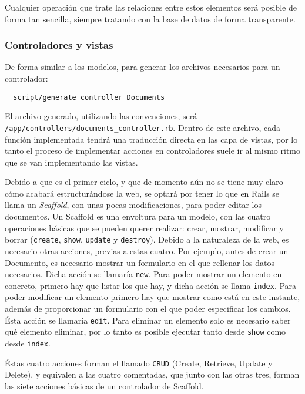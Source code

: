 Cualquier operación que trate las relaciones entre estos elementos será posible de forma tan sencilla, siempre tratando con la base de datos de forma transparente. 


\subsubsection{Controladores y vistas} %
\label{ssub:controlador}

De forma similar a los modelos, para generar los archivos necesarios para un controlador:

\begin{verbatim}
  script/generate controller Documents
\end{verbatim}

El archivo generado, utilizando las convenciones, será \texttt{/app/controllers/documents\_controller.rb}. Dentro de este archivo, cada función implementada tendrá una traducción directa en las capa de vistas, por lo tanto el proceso de implementar acciones en controladores suele ir al mismo ritmo que se van implementando las vistas.

Debido a que es el primer ciclo, y que de momento aún no se tiene muy claro cómo acabará estructurándose la web, se optará por tener lo que en Rails se llama un \emph{Scaffold}, con unas pocas modificaciones, para poder editar los documentos. Un Scaffold es una envoltura para un modelo, con las cuatro operaciones básicas que se pueden querer realizar: crear, mostrar, modificar y borrar (\texttt{create}, \texttt{show}, \texttt{update} y \texttt{destroy}). Debido a la naturaleza de la web, es necesario otras acciones, previas a estas cuatro. Por ejemplo, antes de crear un Documento, es necesario mostrar un formulario en el que rellenar los datos necesarios. Dicha acción se llamaría \texttt{new}. Para poder mostrar un elemento en concreto, primero hay que listar los que hay, y dicha acción se llama \texttt{index}. Para poder modificar un elemento primero hay que mostrar como está en este instante, además de proporcionar un formulario con el que poder especificar los cambios. Ésta acción se llamaría \texttt{edit}. Para eliminar un elemento solo es necesario saber qué elemento eliminar, por lo tanto es posible ejecutar tanto desde \texttt{show} como desde \texttt{index}.

Éstas cuatro acciones forman el llamado \texttt{CRUD} (Create, Retrieve, Update y Delete), y equivalen a las cuatro comentadas, que junto con las otras tres, forman las siete acciones básicas de un controlador de Scaffold.

